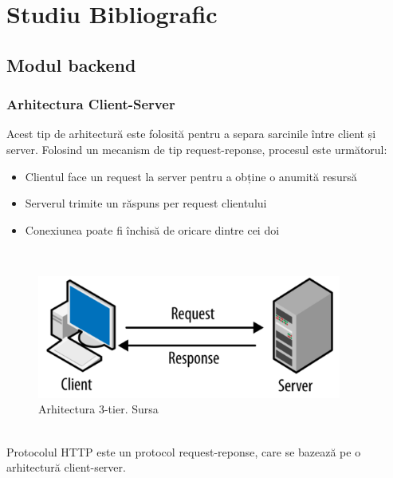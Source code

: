 \chapter{Studiu Bibliografic}\label{ch:studiubib}
\pagestyle{fancy}
\section{Modul backend}
\subsection{Arhitectura Client-Server}
Acest tip de arhitectură este folosită pentru a separa sarcinile între client și server. Folosind un mecanism de tip request-reponse, procesul este următorul:
\vspace{0.5mm}
\begin{itemize}
	\setlength\itemsep{0.5em}
    \item Clientul face un request la server pentru a obține o anumită resursă
    \item Serverul trimite un răspuns per request clientului
    \item Conexiunea poate fi închisă de oricare dintre cei doi
\end{itemize}

\ \\
\begin{figure}[ht]
	\centering
	\includegraphics[width=100mm, scale=2]{figs/clientServerArch.png}
    \caption{Arhitectura 3-tier. Sursa~\cite{ClientServer}}
	\label{fig:clientServerArch}
\end{figure}
\ \\

Protocolul HTTP este un protocol request-reponse, care se bazează pe o arhitectură client-server. \\

